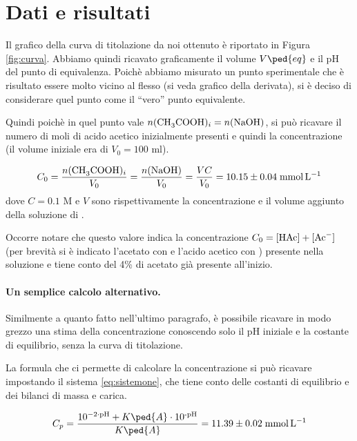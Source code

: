 \section*{Dati e risultati}

Il grafico della curva di titolazione da noi ottenuto è riportato in Figura \ref{fig:curva}. Abbiamo quindi ricavato
graficamente il volume $V\ped{eq}$ e il pH del punto di equivalenza. Poichè abbiamo misurato un punto sperimentale che è risultato
essere molto vicino al flesso (si veda grafico della derivata), si è deciso di considerare quel punto come il ``vero''
punto equivalente.

Quindi poichè in quel punto vale $n(\ce{CH3COOH})_i = n(\ce{NaOH})$, si può ricavare il numero di moli di
acido acetico inizialmente presenti e quindi la concentrazione (il volume iniziale era di $V_0 = 100$ ml).

\begin{equation}
    C_0 = \frac{n(\ce{CH3COOH})_i}{V_0} = \frac{n(\ce{NaOH})}{V_0} = \frac{VC}{V_0} = 10.15 \pm 0.04 \; \si{\milli\mol\per\litre}
\end{equation}
%
dove $C = 0.1$ M e $V$ sono rispettivamente la concentrazione e il volume aggiunto della soluzione di .

Occorre notare che questo valore indica la concentrazione $C_0 = \ce{[HAc] + [Ac- ]}$ (per brevità si è indicato l'acetato con  e l'acido acetico con ) presente nella soluzione
e tiene conto del 4\% di acetato già presente all'inizio.

\paragraph{Un semplice calcolo alternativo.}

Similmente a quanto fatto nell'ultimo paragrafo, è possibile ricavare in modo grezzo una stima
della concentrazione conoscendo solo il pH iniziale e la costante di equilibrio, senza
la curva di titolazione.

La formula che ci permette di calcolare la concentrazione si può ricavare impostando il sistema \eqref{eq:sistemone},
che tiene conto delle costanti di equilibrio e dei bilanci di massa e carica.

\begin{equation}
    C_p = \frac{10^{-2 \cdot \text{pH}} + K\ped{A} \cdot 10^\text{-pH}}{K\ped{A}} = 11.39 \pm 0.02 \; \si{\milli\mol\per\litre}
\end{equation}

